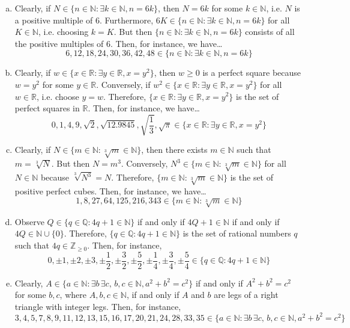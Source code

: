 \documentclass[11pt,letterpaper]{article}
\begin{document}
\sol
\begin{enumerate}[(a)]
\item Clearly, if $N \in \{ n \in \mathbb{N} \colon \exists k \in \mathbb{N}, n= 6k \}$, then $N= 6k$ for some $k \in \mathbb{N}$, i.e. $N$ is a positive multiple of 6. Furthermore, $6K \in \{ n \in \mathbb{N} \colon \exists k \in \mathbb{N}, n= 6k \}$ for all $K \in \mathbb{N}$, i.e. choosing $k= K$. But then $\{ n \in \mathbb{N} \colon \exists k \in \mathbb{N}, n= 6k \}$ consists of all the positive multiples of 6. Then, for instance, we have\dots
	\[
	6, 12, 18, 24, 30, 36, 42, 48 \in \{ n \in \mathbb{N} \colon \exists k \in \mathbb{N}, n= 6k \}
	\]

\item Clearly, if $w \in \{ x \in \mathbb{R} \colon \exists y \in \mathbb{R}, x= y^2 \}$, then $w \geq 0$ is a perfect square because $w= y^2 $ for some $y \in \mathbb{R}$. Conversely, if $w^2 \in \{ x \in \mathbb{R} \colon \exists y \in \mathbb{R}, x= y^2 \}$ for all $w \in \mathbb{R}$, i.e. choose $y= w$. Therefore, $\{ x \in \mathbb{R} \colon \exists y \in \mathbb{R}, x= y^2 \}$ is the set of perfect squares in $\mathbb{R}$. Then, for instance, we have\dots
	\[
	0, 1, 4, 9, \sqrt{2}, \sqrt{12.9845}, \sqrt{\dfrac{1}{3}}, \sqrt{\pi} \in \{ x \in \mathbb{R} \colon \exists y \in \mathbb{R}, x= y^2 \}
	\]

\item Clearly, if $N \in \{ m \in \mathbb{N} \colon \sqrt[3]{m} \in \mathbb{N} \}$, then there exists $m \in \mathbb{N}$ such that $m= \sqrt[3]{N}$. But then $N= m^3$. Conversely, $N^3 \in \{ m \in \mathbb{N} \colon \sqrt[3]{m} \in \mathbb{N} \}$ for all $N \in \mathbb{N}$ because $\sqrt[3]{N^3}= N$. Therefore, $\{ m \in \mathbb{N} \colon \sqrt[3]{m} \in \mathbb{N} \}$ is the set of positive perfect cubes. Then, for instance, we have\dots
	\[
	1, 8, 27, 64, 125, 216, 343 \in \{ m \in \mathbb{N} \colon \sqrt[3]{m} \in \mathbb{N} \}
	\]

\item Observe $Q \in \{ q \in \mathbb{Q} \colon 4q + 1 \in \mathbb{N} \}$ if and only if $4Q + 1 \in \mathbb{N}$ if and only if $4Q \in \mathbb{N} \cup \{ 0 \}$. Therefore, $\{ q \in \mathbb{Q} \colon 4q + 1 \in \mathbb{N} \}$ is the set of rational numbers $q$ such that $4q \in \mathbb{Z}_{\geq 0}$. Then, for instance,
	\[
	0, \pm 1, \pm 2, \pm 3, \pm\frac{1}{2}, \pm\frac{3}{2}, \pm\frac{5}{2}, \pm\frac{1}{4}, \pm\dfrac{3}{4}, \pm\frac{5}{4} \in \{ q \in \mathbb{Q} \colon 4q + 1 \in \mathbb{N} \}
	\]

\item Clearly, $A \in \{ a \in \mathbb{N} \colon \exists b\, \exists c,\, b, c \in \mathbb{N}, a^2 + b^2= c^2 \}$ if and only if $A^2 + b^2= c^2$ for some $b, c$, where $A, b, c \in \mathbb{N}$, if and only if $A$ and $b$ are legs of a right triangle with integer legs. Then, for instance,
	\[
	3, 4, 5, 7, 8, 9, 11, 12, 13, 15, 16, 17, 20, 21, 24, 28, 33, 35 \in \{ a \in \mathbb{N} \colon \exists b\, \exists c,\, b, c \in \mathbb{N}, a^2 + b^2= c^2 \}
	\]
\end{enumerate}
\end{document}
